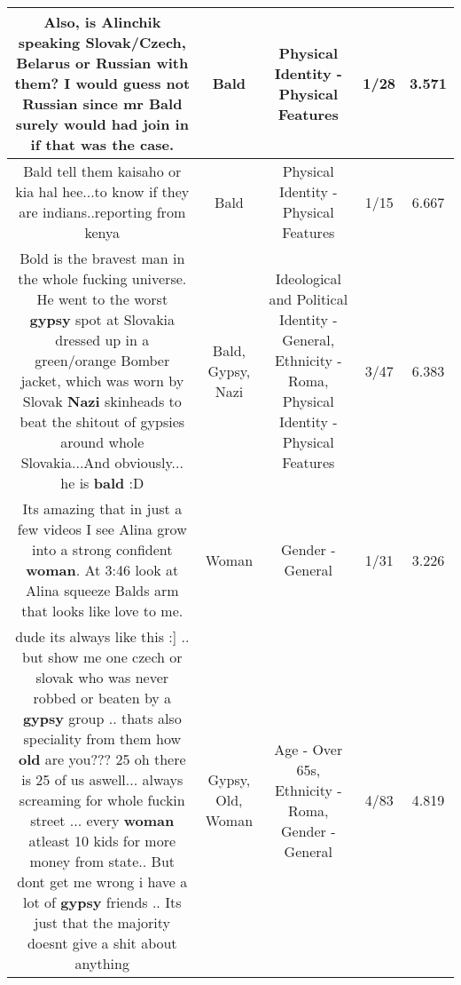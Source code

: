 \documentclass[11pt]{article}
\newlength\mylength
\begin{document}
\begin{center}
\begin{longtable}{|C{.65\mylength}|C{.30\mylength}|C{.12\mylength}|C{.12\mylength}|C{.12\mylength}|}
  \small Also, is Alinchik speaking Slovak/Czech, Belarus or Russian with them? I would guess not Russian since mr \textbf{Bald} surely would had join in if that was the case.\normalsize   & Bald & Physical Identity - Physical Features & 1/28 & 3.571 \\  \hline
  \small Bald tell them kaisaho  or kia hal hee...to know if they are indians..reporting from kenya\normalsize   & Bald & Physical Identity - Physical Features & 1/15 & 6.667 \\  \hline
  \small Bold is the bravest man in the whole fucking universe. He went to the worst \textbf{gypsy} spot at Slovakia dressed up in a green/orange Bomber jacket, which was worn by Slovak \textbf{Nazi} skinheads to beat the shitout of gypsies around whole Slovakia...And obviously... he is \textbf{bald} :D\normalsize   & Bald, Gypsy, Nazi &  Ideological and Political Identity - General, Ethnicity - Roma, Physical Identity - Physical Features & 3/47 & 6.383 \\  \hline
  \small Its amazing that in just a few videos I see Alina grow into a strong confident \textbf{woman}.  At 3:46 look at Alina squeeze Balds arm that looks like love to me.\normalsize   & Woman & Gender - General & 1/31 & 3.226 \\  \hline
  \small dude its always like this :] .. but show me one czech or slovak who was never robbed or beaten by a \textbf{gypsy} group .. thats also speciality from them how \textbf{old} are you??? 25 oh there is 25 of us aswell... always screaming for whole fuckin street ... every \textbf{woman} atleast 10 kids for more money from state.. But dont get me wrong i have a lot of \textbf{gypsy} friends .. Its just that the majority doesnt give a shit about anything\normalsize   & Gypsy, Old, Woman & Age - Over 65s, Ethnicity - Roma, Gender - General & 4/83 & 4.819 \\  \hline

\end{longtable}
\end{center}
\end{document}
